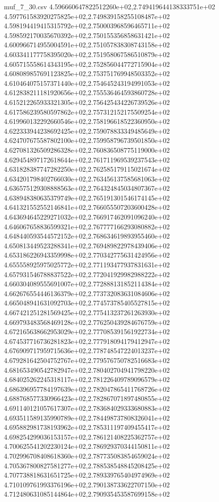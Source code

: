 \begin{filecontents*}{muf_7_30.csv}
4.596660647822512260e+02,2.749419644138333751e+02
4.597761583920275825e+02,2.749839158255108487e+02
4.598194419415315792e+02,2.750003968596465711e+02
4.598592170035670392e+02,2.750155356858631421e+02
4.600966714955004591e+02,2.751057838308743158e+02
4.603341177758395020e+02,2.751958067586510879e+02
4.605715558614343195e+02,2.752856044772715904e+02
4.608089857691123825e+02,2.753751769948503352e+02
4.610464075157371440e+02,2.754645243194991053e+02
4.612838211181920656e+02,2.755536464593860728e+02
4.615212265933321305e+02,2.756425434226739526e+02
4.617586239580597862e+02,2.757312152175509254e+02
4.619960132292660546e+02,2.758196618522360950e+02
4.622333944238692425e+02,2.759078833349485649e+02
4.624707675587802100e+02,2.759958796739501850e+02
4.627081326509286328e+02,2.760836508775119000e+02
4.629454897172618644e+02,2.761711969539237543e+02
4.631828387747282250e+02,2.762585179115021674e+02
4.634201798402766030e+02,2.763456137585681063e+02
4.636575129308888563e+02,2.764324845034807367e+02
4.638948380635379749e+02,2.765191301546174145e+02
4.641321552552146841e+02,2.766055507203600428e+02
4.643694645229271032e+02,2.766917462091096240e+02
4.646067658836599321e+02,2.767777166293080882e+02
4.648440593544572152e+02,2.768634619893955460e+02
4.650813449523288341e+02,2.769489822978439406e+02
4.653186226943359998e+02,2.770342775631424956e+02
4.655558925975025772e+02,2.771193477937831631e+02
4.657931546788837522e+02,2.772041929982988222e+02
4.660304089555691007e+02,2.772888131852114384e+02
4.662676554446136379e+02,2.773732083631084606e+02
4.665048941631092703e+02,2.774573785405527815e+02
4.667421251281569425e+02,2.775413237261263930e+02
4.669793483568469128e+02,2.776250439284676759e+02
4.672165638662953029e+02,2.777085391561922734e+02
4.674537716736281823e+02,2.777918094179412947e+02
4.676909717959715636e+02,2.778748547224013237e+02
4.679281642504752767e+02,2.779576750782516683e+02
4.681653490542782947e+02,2.780402704941798220e+02
4.684025262245318117e+02,2.781226409789096579e+02
4.686396957784197639e+02,2.782047865411768726e+02
4.688768577330966423e+02,2.782867071897480855e+02
4.691140121057617307e+02,2.783684029333680883e+02
4.693511589135990789e+02,2.784498737808326041e+02
4.695882981738193962e+02,2.785311197409455417e+02
4.698254299036153157e+02,2.786121408225362757e+02
4.700625541202230124e+02,2.786929370344150811e+02
4.702996708408618360e+02,2.787735083854659024e+02
4.705367800827581277e+02,2.788538548845208425e+02
4.707738818631651725e+02,2.789339765404974969e+02
4.710109761993376196e+02,2.790138733622707150e+02
4.712480631085144864e+02,2.790935453587699158e+02

\end{filecontents*}
